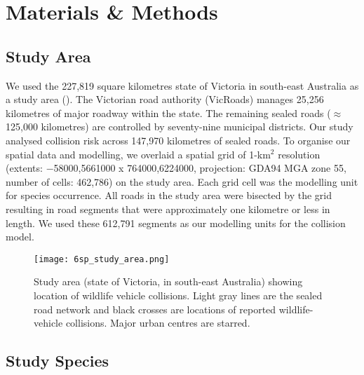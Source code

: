 \section{Materials \& Methods}

\subsection{Study Area}

We used the 227,819 square kilometres state of Victoria in south-east Australia as a study area (). The Victorian road authority (VicRoads) manages 25,256 kilometres of major roadway within the state. The remaining sealed roads ($\approx$ 125,000 kilometres) are controlled by seventy-nine municipal districts. Our study analysed collision risk across 147,970 kilometres of sealed roads. To organise our spatial data and modelling, we overlaid a spatial grid of 1-km$^2$ resolution (extents: $-$58000,5661000 x 764000,6224000, projection: GDA94 MGA zone 55, number of cells: 462,786) on the study area. Each grid cell was the modelling unit for species occurrence. All roads in the study area were bisected by the grid resulting in road segments that were approximately one kilometre or less in length. We used these 612,791 segments as our modelling units for the collision model.

\begin{figure*}[!t]
  \centering
  \texttt{[image: 6sp\_study\_area.png]}
  \caption[Wildlife-vehicle collisions in Victoria]{Study area (state of Victoria, in south-east Australia) showing location of wildlife vehicle collisions. Light gray lines are the sealed road network and black crosses are locations of reported wildlife-vehicle collisions. Major urban centres are starred.}
  \label{6sp_study_area}
\end{figure*}

\subsection{Study Species}

